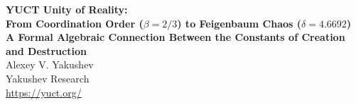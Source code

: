 \documentclass[12pt,a4paper]{article}
\begin{document}
	
	
		\centering
		\vspace*{2cm}
		
		{\Huge\bfseries YUCT Unity of Reality:\\[0.3cm]
			From Coordination Order (\(\beta = 2/3\)) to Feigenbaum Chaos (\(\delta = 4.6692\))}\\[1cm]
		
		{\Large\bfseries A Formal Algebraic Connection Between the Constants of Creation and Destruction}\\[2cm]
		
		{\large Alexey V. Yakushev}\\[0.5cm]
		{\normalsize Yakushev Research}\\[0.3cm]
		{\normalsize \url{https://yuct.org/}}\\[1.5cm]
		
\end{document}
